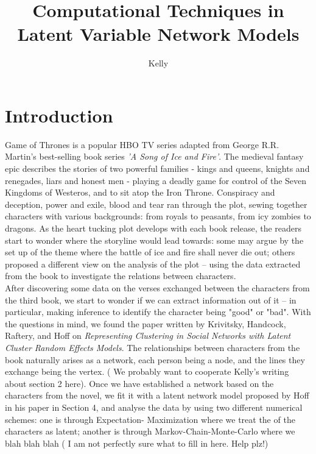 \documentclass{article}
\title{Computational Techniques in Latent Variable Network Models}
\author{Kelly}
\begin{document}
\maketitle

\section{Introduction}

Game of Thrones is a popular HBO TV series adapted from George R.R. Martin's best-selling book series \textit{'A Song of Ice and Fire'}. The medieval fantasy epic describes the stories of two powerful families - kings and queens, knights and renegades, liars and honest men - playing a deadly game for control of the Seven Kingdoms of Westeros, and to sit atop the Iron Throne. Conspiracy and deception, power and exile, blood and tear ran through the plot, sewing together characters with various backgrounds: from royals to peasants, from icy zombies to dragons. As the heart tucking plot develops with each book release, the readers start to wonder where the storyline would lead towards: some may argue by the set up of the theme where the battle of ice and fire shall never die out; others proposed a different view on the analysis of the plot -- using the data extracted from the book to investigate the relations between characters.  \\

After discovering some data on the verses exchanged between the characters from the third book, we start to wonder if we can extract information out of it -- in particular, making inference to identify the character being "good" or "bad". With the questions in mind, we found the paper written by Krivitsky, Handcock, Raftery, and Hoff on \textit{Representing Clustering in Social Networks with Latent Cluster Random Effects Models}. The relationships between characters from the book naturally arises as a network, each person being a node, and the lines they exchange being the vertex. ( We probably want to cooperate Kelly's writing about section 2 here). 
Once we have established a network based on the characters from the novel, we fit it with a latent network model proposed by Hoff in his paper in Section 4, and analyse the data by using two different numerical schemes: one is through Expectation- Maximization where we treat the of the characters as latent; another is through Markov-Chain-Monte-Carlo where we blah blah blah ( I am not perfectly sure what to fill in here. Help plz!)  \\
\end{document}
